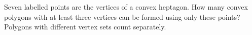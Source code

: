 Seven labelled points are the vertices of a convex heptagon. How many convex polygons with at least three vertices can be formed using only these points? Polygons with different vertex sets count separately.
